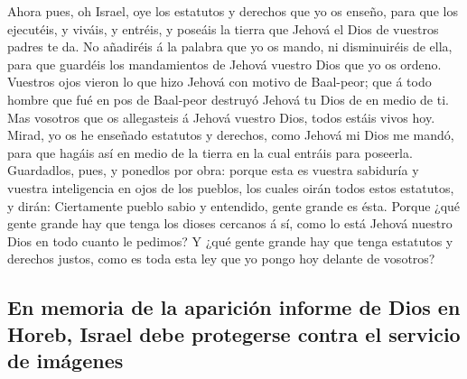  Ahora pues, oh Israel, oye los estatutos y derechos que
yo os enseño, para que los ejecutéis, y viváis, y entréis, y poseáis la
tierra que Jehová el Dios de vuestros padres te da.  No
añadiréis á la palabra que yo os mando, ni disminuiréis de ella, para
que guardéis los mandamientos de Jehová vuestro Dios que yo os ordeno.
 Vuestros ojos vieron lo que hizo Jehová con motivo de
Baal-peor; que á todo hombre que fué en pos de Baal-peor destruyó Jehová
tu Dios de en medio de ti.  Mas vosotros que os
allegasteis á Jehová vuestro Dios, todos estáis vivos hoy.
 Mirad, yo os he enseñado estatutos y derechos, como
Jehová mi Dios me mandó, para que hagáis así en medio de la tierra en la
cual entráis para poseerla.  Guardadlos, pues, y ponedlos
por obra: porque esta es vuestra sabiduría y vuestra inteligencia en
ojos de los pueblos, los cuales oirán todos estos estatutos, y dirán:
Ciertamente pueblo sabio y entendido, gente grande es ésta.
 Porque ¿qué gente grande hay que tenga los dioses
cercanos á sí, como lo está Jehová nuestro Dios en todo cuanto le
pedimos?  Y ¿qué gente grande hay que tenga estatutos y
derechos justos, como es toda esta ley que yo pongo hoy delante de
vosotros?

\hypertarget{en-memoria-de-la-apariciuxf3n-informe-de-dios-en-horeb-israel-debe-protegerse-contra-el-servicio-de-imuxe1genes}{%
\subsection{En memoria de la aparición informe de Dios en Horeb, Israel
debe protegerse contra el servicio de
imágenes}\label{en-memoria-de-la-apariciuxf3n-informe-de-dios-en-horeb-israel-debe-protegerse-contra-el-servicio-de-imuxe1genes}}

